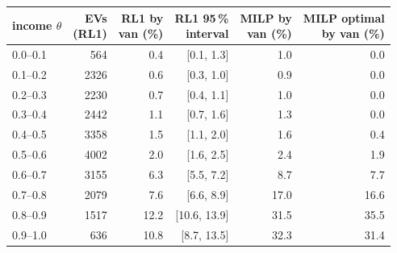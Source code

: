 \begin{tabular}{@{}lrrrrr@{}}
\toprule
income $\theta$ & \shortstack[r]{EVs\\(RL1)} & \shortstack[r]{RL1 by\\van (\%)} & \shortstack[r]{RL1 95\,\%\\interval} & \shortstack[r]{MILP by\\van (\%)} & \shortstack[r]{MILP optimal\\by van (\%)} \\
\midrule
0.0--0.1 & 564 & 0.4 & [0.1, 1.3] & 1.0 & 0.0 \\
0.1--0.2 & 2326 & 0.6 & [0.3, 1.0] & 0.9 & 0.0 \\
0.2--0.3 & 2230 & 0.7 & [0.4, 1.1] & 1.0 & 0.0 \\
0.3--0.4 & 2442 & 1.1 & [0.7, 1.6] & 1.3 & 0.0 \\
0.4--0.5 & 3358 & 1.5 & [1.1, 2.0] & 1.6 & 0.4 \\
0.5--0.6 & 4002 & 2.0 & [1.6, 2.5] & 2.4 & 1.9 \\
0.6--0.7 & 3155 & 6.3 & [5.5, 7.2] & 8.7 & 7.7 \\
0.7--0.8 & 2079 & 7.6 & [6.6, 8.9] & 17.0 & 16.6 \\
0.8--0.9 & 1517 & 12.2 & [10.6, 13.9] & 31.5 & 35.5 \\
0.9--1.0 & 636 & 10.8 & [8.7, 13.5] & 32.3 & 31.4 \\
\bottomrule
\end{tabular}
